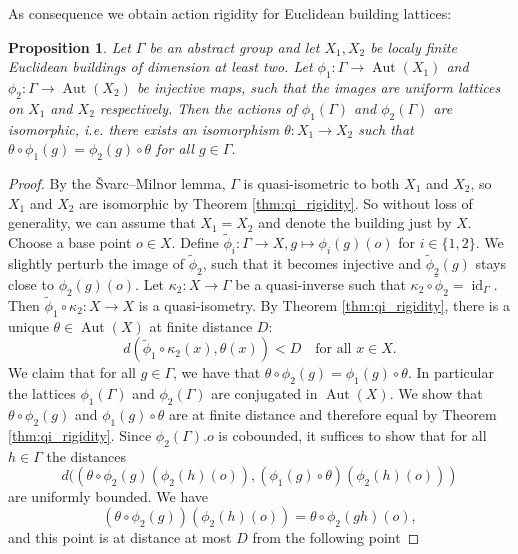 \documentclass[dvipsnames]{article}
\newtheorem{proposition}[theorem]{Proposition}
\theoremstyle{definition}
\theoremstyle{remark}
\DeclareMathOperator{\Aut}{Aut}
\DeclareMathOperator{\id}{id}
\begin{document}
    As consequence we obtain action rigidity for Euclidean building lattices:

    \begin{proposition}\label{prop:action_rigidity}
        Let $\Gamma$ be an abstract group and let $X_1,X_2$ be localy finite Euclidean buildings of dimension at least two.
        Let $\phi_1 : \Gamma \to \Aut(X_1)$ and $\phi_2 : \Gamma \to \Aut(X_2)$ be injective maps, such that the images are uniform lattices on $X_1$ and $X_2$ respectively. Then the actions of $\phi_1(\Gamma)$ and $\phi_2(\Gamma)$ are isomorphic, i.e. there exists an isomorphism $\theta: X_1\to X_2$ such that $\theta \circ \phi_1(g) = \phi_2(g)\circ \theta$ for all $g \in \Gamma$.
    \end{proposition}

    \begin{proof}
        By the \v{S}varc--Milnor lemma, $\Gamma$ is quasi-isometric to both $X_1$ and $X_2$, so $X_1$ and $X_2$ are isomorphic by Theorem \ref{thm:qi_rigidity}. 
        So without loss of generality, we can assume that $X_1=X_2$ and denote the building just by $X$.
        Choose a base point $o \in X$. Define $\tilde \phi_i : \Gamma \to X, g \mapsto \phi_i(g)(o)$ for $i \in \{1,2\}$.
        We slightly perturb the image of $\tilde \phi_2$, such that it becomes injective and $\tilde \phi_2(g)$ stays close to $\phi_2(g)(o)$.
        Let $\kappa_2 : X\to \Gamma$ be a quasi-inverse such that $\kappa_2 \circ \tilde \phi_2 = \id_\Gamma$.
        Then $\tilde \phi_1 \circ \kappa_2 : X \to X$ is a quasi-isometry. By Theorem \ref{thm:qi_rigidity}, there is a unique $\theta\in\Aut(X)$ at finite distance $D$:
        \[
            d(\tilde \phi_1 \circ \kappa_2(x), \theta(x)) < D \quad \text{for all } x\in X.
        \]
        We claim that for all $g \in \Gamma$, we have that $\theta \circ \phi_2(g) = \phi_1(g) \circ\theta$. In particular the lattices $\phi_1(\Gamma)$ and $\phi_2(\Gamma)$ are conjugated in $\Aut(X)$.
        We show that $\theta \circ \phi_2(g)$ and $\phi_1(g) \circ \theta$ are at finite distance and therefore equal by Theorem \ref{thm:qi_rigidity}.
        Since $\phi_2(\Gamma).o$ is cobounded, it suffices to show that for all $h \in \Gamma$ the distances
        \[
            d((\theta \circ \phi_2(g)(\phi_2(h)(o)), (\phi_1(g)\circ \theta)(\phi_2(h)(o)))
        \]
        are uniformly bounded.
        We have 
        \[
            (\theta \circ \phi_2(g))(\phi_2(h)(o)) = \theta \circ \phi_2(gh)(o),
        \]
        and this point is at distance at most $D$ from the following point

\end{proof}
\end{document}
